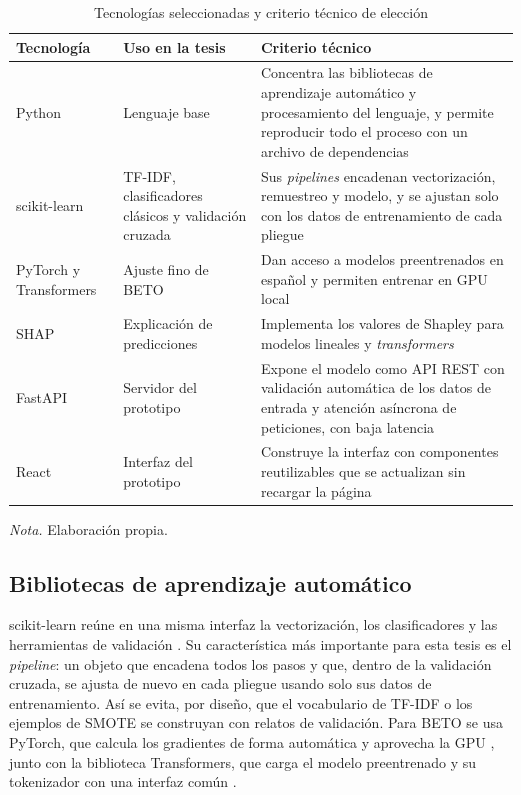 \begin{table}[H]
\begin{threeparttable}
\caption{Tecnologías seleccionadas y criterio técnico de elección}
\label{tab:tecnologias}
\singlespacing\small
\renewcommand{\arraystretch}{1.3}
\begin{tabular}{@{}L{3.2cm} L{3.4cm} L{8.8cm}@{}}
\toprule
\textbf{Tecnología} & \textbf{Uso en la tesis} & \textbf{Criterio técnico} \\
\midrule
Python & Lenguaje base & Concentra las bibliotecas de aprendizaje automático y procesamiento del lenguaje, y permite reproducir todo el proceso con un archivo de dependencias \\
scikit-learn & TF-IDF, clasificadores clásicos y validación cruzada & Sus \textit{pipelines} encadenan vectorización, remuestreo y modelo, y se ajustan solo con los datos de entrenamiento de cada pliegue \citep{pedregosa2011} \\
PyTorch y Transformers & Ajuste fino de BETO & Dan acceso a modelos preentrenados en español y permiten entrenar en GPU local \citep{paszke2019, wolf2020} \\
SHAP & Explicación de predicciones & Implementa los valores de Shapley para modelos lineales y \textit{transformers} \citep{lundberg2017} \\
FastAPI & Servidor del prototipo & Expone el modelo como API REST con validación automática de los datos de entrada y atención asíncrona de peticiones, con baja latencia \\
React & Interfaz del prototipo & Construye la interfaz con componentes reutilizables que se actualizan sin recargar la página \\
\bottomrule
\end{tabular}
\begin{tablenotes}[flushleft]
\small
\item \textit{Nota.} Elaboración propia.
\end{tablenotes}
\end{threeparttable}
\end{table}

\subsection{Bibliotecas de aprendizaje automático}
scikit-learn reúne en una misma interfaz la vectorización, los clasificadores y las herramientas de validación \citep{pedregosa2011}. Su característica más importante para esta tesis es el \textit{pipeline}: un objeto que encadena todos los pasos y que, dentro de la validación cruzada, se ajusta de nuevo en cada pliegue usando solo sus datos de entrenamiento. Así se evita, por diseño, que el vocabulario de TF-IDF o los ejemplos de SMOTE se construyan con relatos de validación. Para BETO se usa PyTorch, que calcula los gradientes de forma automática y aprovecha la GPU \citep{paszke2019}, junto con la biblioteca Transformers, que carga el modelo preentrenado y su tokenizador con una interfaz común \citep{wolf2020}.

